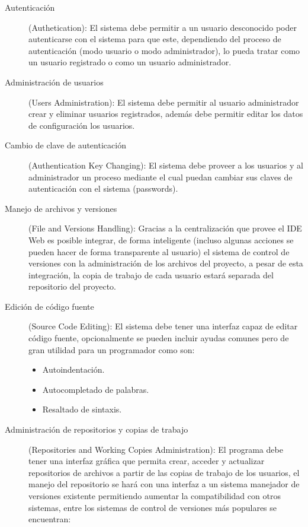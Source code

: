 \begin{description}
	
	\item [Autenticación] (Authetication): \newline
	El sistema debe permitir a un usuario desconocido poder autenticarse con el sistema para que este, dependiendo del proceso de autenticación (modo usuario o modo administrador), lo pueda tratar como un usuario registrado o como un usuario administrador.
	
	\item [Administración de usuarios] (Users Administration): \newline
	El sistema debe permitir al usuario administrador crear y eliminar usuarios registrados, además debe permitir editar los datos de configuración los usuarios.
	
	\item [Cambio de clave de autenticación] (Authentication Key Changing): \newline
	El sistema debe proveer a los usuarios y al administrador un proceso mediante el cual puedan cambiar sus claves de autenticación con el sistema (passwords).
	
	\item [Manejo de archivos y versiones] (File and Versions Handling): \newline
	Gracias a la centralización que provee el IDE Web es posible integrar, de forma inteligente (incluso algunas acciones se pueden hacer de forma transparente al usuario) el sistema de control de versiones con la administración de los archivos del proyecto, a pesar de esta integración, la copia de trabajo de cada usuario estará separada del repositorio del proyecto.
	
	\item [Edición de código fuente] (Source Code Editing): \newline
	El sistema debe tener una interfaz capaz de editar código fuente, opcionalmente se pueden incluir ayudas comunes pero de gran utilidad para un programador como son:
	
	\begin{itemize}
		\item Autoindentación.
		\item Autocompletado de palabras.
		\item Resaltado de sintaxis.
	\end{itemize}
	
	\item [Administración de repositorios y copias de trabajo] (Repositories and Working Copies Administration): \newline
	El programa debe tener una interfaz gráfica que permita crear, acceder y actualizar repositorios de archivos a partir de las copias de trabajo de los usuarios, el manejo del repositorio se hará con una interfaz a un sistema manejador de versiones existente permitiendo aumentar la compatibilidad con otros sistemas, entre los sistemas de control de versiones más populares se encuentran:
	

\end{description}
